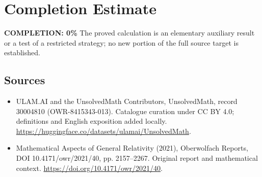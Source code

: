 \documentclass[11pt]{article}
\begin{document}
\section{Completion Estimate}
\noindent\textbf{COMPLETION: 0\%}
The proved calculation is an elementary auxiliary result or a test of a restricted strategy; no new portion of the full source target is established.

\subsection{Sources}
\begin{itemize}
\item[\hypertarget{source:30004810:1}{S1}] ULAM.AI and the UnsolvedMath Contributors, UnsolvedMath, record 30004810 (OWR-8415343-013). Catalogue curation under CC BY 4.0; definitions and English exposition added locally.
\url{https://huggingface.co/datasets/ulamai/UnsolvedMath}.
\item[\hypertarget{source:30004810:2}{S2}] Mathematical Aspects of General Relativity (2021), Oberwolfach Reports, DOI 10.4171/owr/2021/40, pp. 2157--2267. Original report and mathematical context.
\url{https://doi.org/10.4171/owr/2021/40}.
\end{itemize}
\label{end:30004810}
\end{document}
